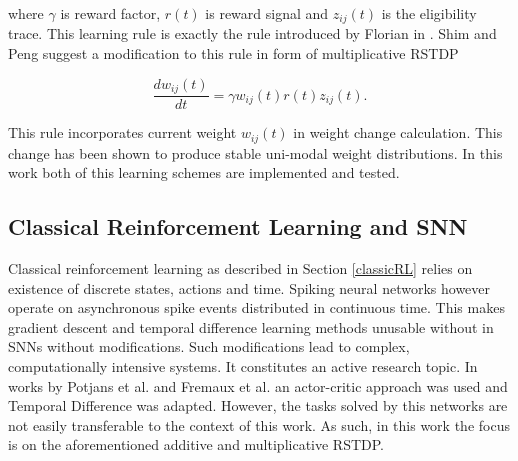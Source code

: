where \(\gamma\) is reward factor, \(r(t)\) is reward signal and \(z_{ij}(t)\) is the eligibility trace. This learning rule is exactly the rule introduced by Florian in \cite{15}. Shim and Peng suggest a modification to this rule in form of multiplicative RSTDP

\begin{equation*} 
	\frac{dw_{ij}(t)}{dt}=\gamma w_{ij}(t)r(t)z_{ij}(t).
\end{equation*}\label{eq:multiplicativeSTDP}

This rule incorporates current weight \(w_{ij}(t)\) in weight change calculation. This change has been shown to produce stable uni-modal weight distributions. In this work both of this learning schemes are implemented and tested.

\subsection{Classical Reinforcement Learning and SNN}\label{snnRL}

Classical reinforcement learning as described in Section \ref{classicRL} relies on existence of discrete states, actions and time. Spiking neural networks however operate on asynchronous spike events distributed in continuous time. This makes gradient descent and temporal difference learning methods unusable without in SNNs without modifications. Such modifications lead to complex, computationally intensive systems. It constitutes an active research topic. In works by Potjans et al. \cite{18} and Fremaux et al. \cite{19} an actor-critic approach was used and Temporal Difference was adapted. However, the tasks solved by this networks are not easily transferable to the context of this work. As such, in this work the focus is on the aforementioned additive and multiplicative RSTDP.
